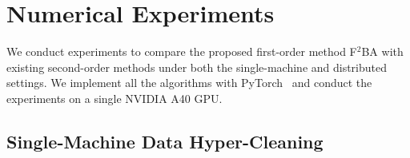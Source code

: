 \documentclass{article}
\begin{document}

 
\section{Numerical Experiments}

We conduct experiments to compare the proposed first-order method F${}^2$BA with existing second-order methods under both the single-machine and distributed settings.
We implement all the algorithms with PyTorch~\citep{paszke2019pytorch} and conduct the experiments on a single NVIDIA A40 GPU.

\subsection{Single-Machine Data Hyper-Cleaning} \label{sec:exp-clean}
\end{document}
